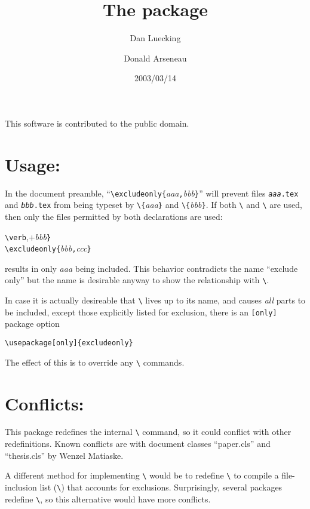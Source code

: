 \documentclass[pagesize=auto]{scrartcl}
\title{The \pkg{excludeonly} package}
\author{Dan Luecking \mail{luecking@uark.edu}\and Donald Arseneau \mail{asnd@triumf.ca}}
\date{2003/03/14}
\makeatletter
\newcommand*{\cls}[1]{\textsf{#1}}
\newcommand*{\cs}[1]{\texttt{\textbackslash#1}}
\newcommand*{\cmd}[1]{\cs{\expandafter\@gobble\string#1}}
\newcommand*{\opt}[1]{\texttt{#1}}
\newcommand*{\meta}[1]{\textlangle\textsl{#1}\textrangle}
\newcommand*{\marg}[1]{\texttt{\{}\meta{#1}\texttt{\}}}
\makeatother
\begin{document}
\maketitle

\noindent
This software is contributed to the public domain.


\section{Usage:}

In the document preamble, ``\verb+\excludeonly{+\meta{aaa}\verb+,+\meta{bbb}\verb+}+'' will prevent files
\texttt{\meta{aaa}.tex} and \texttt{\meta{bbb}.tex} from being typeset by \cmd{}\marg{aaa} and \cmd{}\marg{bbb}. 
If both \cmd{} and \cmd{\excludeonly} are used, then only the files
permitted by both declarations are used:
%
\begin{flushleft}
\verb+\verb+,+\meta{bbb}\verb+}+\\
\verb+\excludeonly{+\meta{bbb}\verb+,+\meta{ccc}\verb+}+
\end{flushleft}
%
results in only \meta{aaa} being included.
This behavior contradicts the name ``exclude only'' but the name is 
desirable anyway to show the relationship with \cmd{}.

In case it is actually desireable that \cmd{\excludeonly} lives up
to its name, and causes \emph{all} parts to be included, except those
explicitly listed for exclusion, there is an \opt{[only]} package option
%
\begin{verbatim}
\usepackage[only]{excludeonly}
\end{verbatim}
%
The effect of this is to override any \cmd{} commands.


\section{Conflicts:}

This package redefines the internal \cmd{\@include} command, so it could
conflict with other redefinitions.  Known conflicts are with document 
classes ``\cls{paper.cls}'' and ``\cls{thesis.cls}'' by Wenzel Matiaske.

A different method for implementing \cmd{\excludeonly} would be to 
redefine \cmd{\@setckpt} to compile a file-inclusion list (\cmd{\@partlist})
that accounts for exclusions.  Surprisingly, several packages
redefine \cmd{\@setckpt}, so this alternative would have more conflicts.
\end{document}
